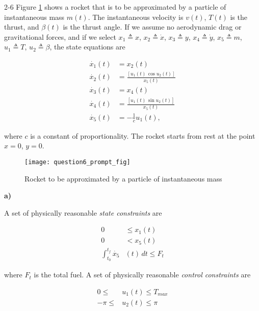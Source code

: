 \begin{problem}{2-6}
Figure \ref{fig:question6_prompt_fig} shows a rocket that is to be approximated
by a particle of instantaneous mass $m(t)$. The instantaneous velocity is $v(t)$,
$T(t)$ is the thrust, and $\beta(t)$ is the thrust angle. If we assume no
aerodynamic drag or gravitational forces, and if we select $x_1 \triangleq x$,
$x_2 \triangleq \dot{x}$, $x_3 \triangleq y$, $x_4 \triangleq \dot{y}$, $x_5 \triangleq m$,
$u_1 \triangleq T$, $u_2 \triangleq \beta$, the state equations are

\begin{align}
  \dot{x_1}(t) &= x_2(t) \nonumber \\
  \dot{x_2}(t) &= \frac{[u_1(t)\, \cos u_2(t)]}{x_5(t)} \nonumber \\
  \dot{x_3}(t) &= x_4(t) \nonumber \\
  \dot{x_4}(t) &= \frac{[u_1(t)\, \sin u_2(t)]}{x_5(t)} \nonumber \\
  \dot{x_5}(t) &= -\frac{1}{c}u_1(t), \nonumber
\end{align}

\noindent where $c$ is a constant of proportionality. The rocket starts from
rest at the point $x = 0$, $y = 0$.
\end{problem}


\begin{figure}[H]
    \texttt{[image: question6\_prompt\_fig]}
    \centering
    \caption{Rocket to be approximated by a particle of instantaneous mass \cite{kirkdover}}
    \label{fig:question6_prompt_fig}
\end{figure}

\noindent \textbf{a)}

A set of physically reasonable \textit{state constraints} are

\begin{align}
  0 &\leq x_1(t) \nonumber \\
  0 &< x_5(t) \nonumber \\
  \int_{t_0}^{t_f} \dot{x_5}&(t) \, dt \leq F_t \nonumber
\end{align}

\noindent where $F_t$ is the total fuel. A set of physically reasonable
\textit{control constraints} are

\begin{align}
     0 \leq & u_1(t) \leq T_{max} \nonumber \\
  -\pi \leq & u_2(t) \leq \pi \nonumber
\end{align}


